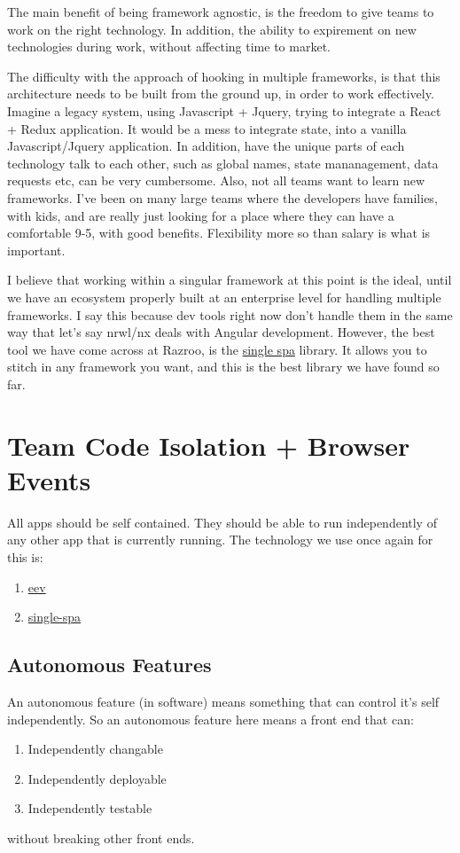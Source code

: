 The main benefit of being framework agnostic, is the freedom to give teams to work on the right technology. In addition, the ability to expirement on new technologies during work, without affecting time to market. 

The difficulty with the approach of hooking in multiple frameworks, is that this architecture needs to be built from the ground up, in order to work effectively. Imagine a legacy system, using Javascript + Jquery, trying to integrate a React + Redux application. It would be a mess to integrate state, into a vanilla Javascript/Jquery application. In addition, have the unique parts of each technology talk to each other, such as global names, state mananagement, data requests etc, can be very cumbersome. Also, not all teams want to learn new frameworks. I've been on many large teams where the developers have families, with kids, and are really just looking for a place where they can have a comfortable 9-5, with good benefits. Flexibility more so than salary is what is important. 

I believe that working within a singular framework at this point is the ideal, until we have an ecosystem properly built at an enterprise level for handling multiple frameworks. I say this because dev tools right now don't handle them in the same way that let's say nrwl/nx deals with Angular development. However, the best tool we have come across at Razroo, is the \href{github.com/CanopyTax/single-spa}{single spa} library. It allows you to stitch in any framework you want, and this is the best library we have found so far. 

\section{Team Code Isolation + Browser Events}
All apps should be self contained. They should be able to run independently of any other app that is currently running. The technology we use once again for this is: 
\begin{enumerate}
  \item \href{github.com/chrisdavies/eev}{eev}
  \item \href{github.com/CanopyTax/single-spa}{single-spa}
\end{enumerate}


\subsection{Autonomous Features}
An autonomous feature (in software) means something that can control it's self independently. So an autonomous feature here means a front end that can:
\begin{enumerate}
  \item Independently changable 
  \item Independently deployable
  \item Independently testable
\end{enumerate}
without breaking other front ends. 

